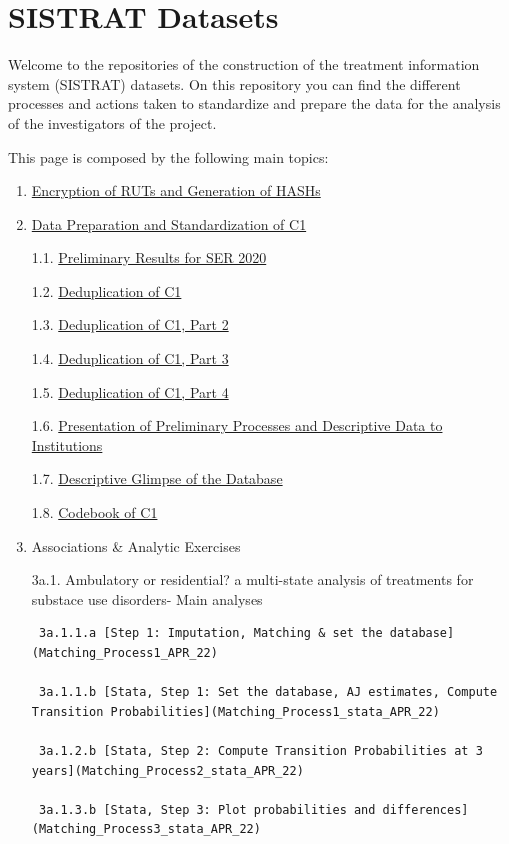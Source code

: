 \documentclass[
]{article}
\author{}
\date{\vspace{-2.5em}}
\begin{document}
\hypertarget{sistrat-datasets}{%
\section{SISTRAT Datasets}\label{sistrat-datasets}}

Welcome to the repositories of the construction of the treatment
information system (SISTRAT) datasets. On this repository you can find
the different processes and actions taken to standardize and prepare the
data for the analysis of the investigators of the project.

This page is composed by the following main topics:

\begin{enumerate}
\def\labelenumi{\arabic{enumi}.}
\item
  \href{Encript.html}{Encryption of RUTs and Generation of HASHs}
\item
  \href{Data_prep_C1}{Data Preparation and Standardization of C1}

  1.1. \href{SER_Stata.html}{Preliminary Results for SER 2020}

  1.2. \href{Duplicates}{Deduplication of C1}

  1.3. \href{Duplicates2}{Deduplication of C1, Part 2}

  1.4. \href{Duplicates3}{Deduplication of C1, Part 3}

  1.5. \href{Duplicates4}{Deduplication of C1, Part 4}

  1.6. \href{Presentación2}{Presentation of Preliminary Processes and
  Descriptive Data to Institutions}

  1.7. \href{Desc}{Descriptive Glimpse of the Database}

  1.8. \href{codebook}{Codebook of C1}
\item
  Associations \& Analytic Exercises

  3a.1. Ambulatory or residential? a multi-state analysis of treatments
  for substace use disorders- Main analyses

\begin{verbatim}
 3a.1.1.a [Step 1: Imputation, Matching & set the database](Matching_Process1_APR_22)

 3a.1.1.b [Stata, Step 1: Set the database, AJ estimates, Compute Transition Probabilities](Matching_Process1_stata_APR_22)

 3a.1.2.b [Stata, Step 2: Compute Transition Probabilities at 3 years](Matching_Process2_stata_APR_22)

 3a.1.3.b [Stata, Step 3: Plot probabilities and differences](Matching_Process3_stata_APR_22)


\end{verbatim}
\end{enumerate}
\end{document}

